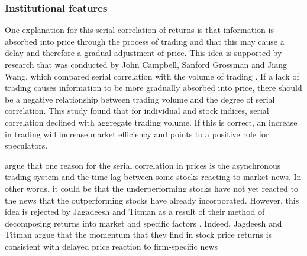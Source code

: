 \documentclass[12pt, a4paper, oneside]{article} %
\begin{document}
\subsubsection{Institutional features}
One explanation for this serial correlation of returns is that information is absorbed into price through the process of trading and that this may cause a delay and therefore a gradual adjustment of price.  This idea is supported by research that was conducted by John Campbell, Sanford Grossman and Jiang Wang, which compared serial correlation with the volume of trading \citep{CampbellGrossmanWang}.  If a lack of trading causes information to be more gradually absorbed into price, there should be a negative relationship between trading volume and the degree of serial correlation.  This study found that for individual and stock indices, serial correlation declined with aggregate trading volume.  If this is correct, an increase in trading will increase market efficiency and points to a positive role for speculators. 

\citep{LoMacKinlay1990} argue that one reason for the serial correlation in prices is the asynchronous trading system and the time lag between some stocks reacting to market news.  In other words, it could be that the underperforming stocks have not yet reacted to the news that the outperforming stocks have already incorporated.  However, this idea is rejected by Jagadeesh and Titman as a result of their method of decomposing returns into market and specific factors \citep[p. 73]{Jagadeesh}.  Indeed, Jagdeesh and Titman argue that the momentum that they find in stock price returns is consistent with delayed price reaction to firm-specific news \citep{Jagadeesh} 



\end{document}
